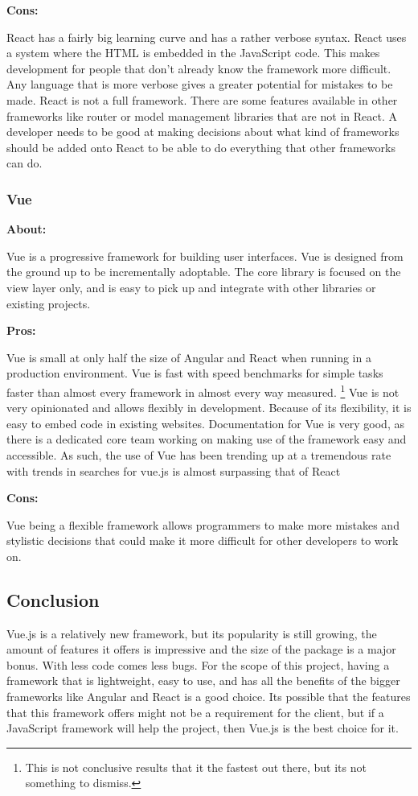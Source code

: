 \documentclass[draftclsnofoot,onecolumn,letterpaper,10pt,compsoc]{IEEEtran}
\begin{document}
    \noindent \textbf{Cons:}

    React has a fairly big learning curve and has a rather verbose syntax.
    React uses a system where the HTML is embedded in the JavaScript code.
    This makes development for people that don't already know the framework more difficult.
    Any language that is more verbose gives a greater potential for mistakes to be made.
    React is not a full framework.
    There are some features available in other frameworks like router or model management libraries that are not in React.
    A developer needs to be good at making decisions about what kind of frameworks should be added onto React to be able to do everything that other frameworks can do.


    \subsubsection{Vue}

    \textbf{About:}

    Vue is a progressive framework for building user interfaces.
    Vue is designed from the ground up to be incrementally adoptable.
    The core library is focused on the view layer only, and is easy to pick up and integrate with other libraries or existing projects.


    \textbf{Pros:}

    Vue is small at only half the size of Angular and React when running in a production environment.
    Vue is fast with speed benchmarks for simple tasks faster than almost every framework in almost every way measured.
    \footnote{This is not conclusive results that it the fastest out there, but its not something to dismiss.\cite{SpeedReport}}
    Vue is not very opinionated and allows flexibly in development.\cite{Vue}
    Because of its flexibility, it is easy to embed code in existing websites.
    Documentation for Vue is very good, as there is a dedicated core team working on making use of the framework easy and accessible.
    As such, the use of Vue has been trending up at a tremendous rate with trends in searches for vue.js is almost surpassing that of React\cite{vueVSreactSearches}

    \textbf{Cons:}

    Vue being a flexible framework allows programmers to make more mistakes and stylistic decisions that could make it more difficult for other developers to work on.


  \subsection{Conclusion}
    Vue.js is a relatively new framework, but its popularity is still growing, the amount of features it offers is impressive and the size of the package is a major bonus.
    With less code comes less bugs.
    For the scope of this project, having a framework that is lightweight, easy to use, and has all the benefits of the bigger frameworks like Angular and React is a good choice.
    Its possible that the features that this framework offers might not be a requirement for the client, but if a JavaScript framework will help the project, then Vue.js is the best choice for it.
\end{document}
